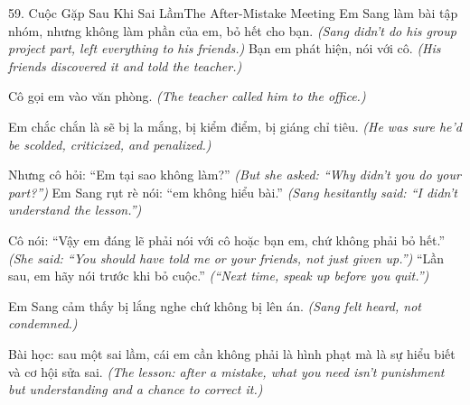 \begin{truyen}{59. Cuộc Gặp Sau Khi Sai Lầm}{The After-Mistake Meeting}
Em Sang làm bài tập nhóm, nhưng không làm phần của em, bỏ hết cho bạn.
\textit{(Sang didn't do his group project part, left everything to his friends.)}
Bạn em phát hiện, nói với cô.
\textit{(His friends discovered it and told the teacher.)}

Cô gọi em vào văn phòng.
\textit{(The teacher called him to the office.)}

Em chắc chắn là sẽ bị la mắng, bị kiểm điểm, bị giáng chỉ tiêu.
\textit{(He was sure he'd be scolded, criticized, and penalized.)}

Nhưng cô hỏi: ``Em tại sao không làm?''
\textit{(But she asked: ``Why didn't you do your part?'')}
Em Sang rụt rè nói: ``em không hiểu bài.''
\textit{(Sang hesitantly said: ``I didn't understand the lesson.'')}

Cô nói: ``Vậy em đáng lẽ phải nói với cô hoặc bạn em, chứ không phải bỏ hết.''
\textit{(She said: ``You should have told me or your friends, not just given up.'')}
``Lần sau, em hãy nói trước khi bỏ cuộc.''
\textit{(``Next time, speak up before you quit.'')}

Em Sang cảm thấy bị lắng nghe chứ không bị lên án.
\textit{(Sang felt heard, not condemned.)}

Bài học: sau một sai lầm, cái em cần không phải là hình phạt mà là sự hiểu biết và cơ hội sửa sai.
\textit{(The lesson: after a mistake, what you need isn't punishment but understanding and a chance to correct it.)}
\end{truyen}

